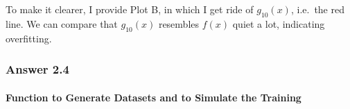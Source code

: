 \documentclass[11pt]{article}
\begin{document}
To make it clearer, I provide Plot B, in which I get ride of
\(g_{10}(x)\), i.e.~the red line. We can compare that \(g_{10}(x)\)
resembles \(f(x)\) quiet a lot, indicating overfitting.

    \hypertarget{answer-2.4}{%
\subsubsection{Answer 2.4}\label{answer-2.4}}

    \hypertarget{function-to-generate-datasets-and-to-simulate-the-training}{%
\paragraph{Function to Generate Datasets and to Simulate the
Training}\label{function-to-generate-datasets-and-to-simulate-the-training}}
\end{document}
